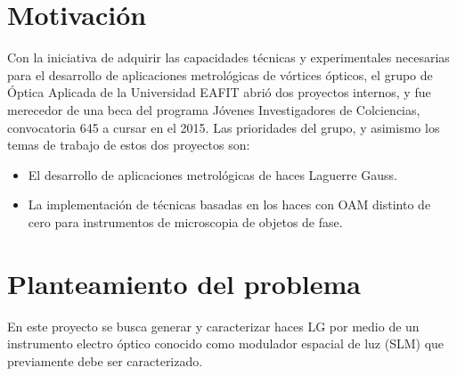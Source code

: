 \section{Motivación\label{sec:motiv}}

Con la iniciativa de adquirir las capacidades técnicas y experimentales
necesarias para el desarrollo de aplicaciones metrológicas de vórtices
ópticos, el grupo de Óptica 
Aplicada de la Universidad EAFIT abrió dos proyectos internos, y
fue merecedor de una beca del programa Jóvenes Investigadores de Colciencias,
convocatoria 645 a cursar en el 2015.  
Las prioridades del grupo, y asimismo los temas de trabajo de estos
dos proyectos son: 
\begin{itemize}
\item El desarrollo de aplicaciones metrológicas de haces Laguerre
  Gauss. 
\item La implementación de técnicas basadas en los haces con OAM
  distinto de cero para instrumentos de microscopia de objetos de fase. 
\end{itemize}

\section{Planteamiento del problema}

\label{sec:planteamiento}

En este proyecto se busca generar y caracterizar haces LG por medio de
un instrumento electro óptico conocido como modulador espacial de luz
(SLM) que previamente debe ser caracterizado. 


